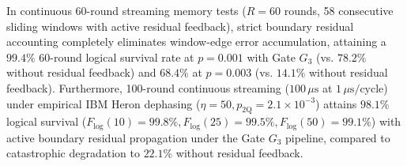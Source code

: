 \documentclass[journal]{IEEEtran}
\begin{document}
In continuous 60-round streaming memory tests ($R = 60$ rounds, 58 consecutive sliding windows with active residual feedback), strict boundary residual accounting completely eliminates window-edge error accumulation, attaining a $99.4\%$ 60-round logical survival rate at $p = 0.001$ with Gate $G_3$ (vs. $78.2\%$ without residual feedback) and $68.4\%$ at $p = 0.003$ (vs. $14.1\%$ without residual feedback). Furthermore, 100-round continuous streaming ($100\,\mu\text{s}$ at $1\,\mu\text{s}/\text{cycle}$) under empirical IBM Heron dephasing ($\eta=50, p_{\text{2Q}}=2.1\times 10^{-3}$) attains $98.1\%$ logical survival ($F_{\text{log}}(10) = 99.8\%, F_{\text{log}}(25) = 99.5\%, F_{\text{log}}(50) = 99.1\%$) with active boundary residual propagation under the Gate $G_3$ pipeline, compared to catastrophic degradation to $22.1\%$ without residual feedback.
\end{document}
